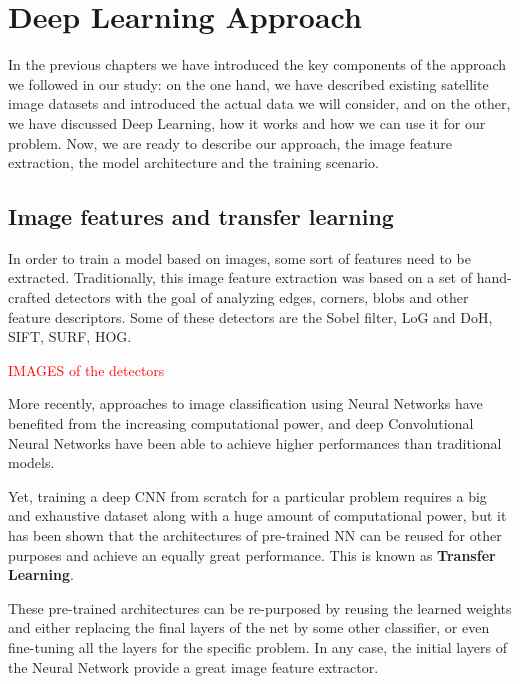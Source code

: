 
\chapter{Deep Learning Approach}

\label{Chapter4}


In the previous chapters we have introduced the key components of the approach we followed in our study: on the one hand, we have described existing satellite image datasets and introduced the actual data we will consider, and on the other, we have discussed Deep Learning, how it works and how we can use it for our problem. Now, we are ready to describe our approach, the image feature extraction, the model architecture and the training scenario.

\section{Image features and transfer learning}\label{transferLearning}

In order to train a model based on images, some sort of features need to be extracted. Traditionally, this image feature extraction was based on a set of hand-crafted detectors with the goal of analyzing edges, corners, blobs  and other feature descriptors. Some of these detectors are the Sobel filter, LoG and DoH, SIFT, SURF, HOG.

\textcolor{red}{IMAGES of the detectors}

More recently, approaches to image classification using Neural Networks have benefited from the increasing computational power, and deep Convolutional Neural Networks have been able to achieve higher performances than traditional models. 

Yet, training a deep CNN from scratch for a particular problem requires a big and exhaustive dataset along with a huge amount of computational power, but it has been shown that the architectures of pre-trained NN can be reused for other purposes and achieve an equally great performance. This is known as \textbf{Transfer Learning}.

These pre-trained architectures can be re-purposed by reusing the learned weights and either replacing the final layers of the net by some other classifier, or even fine-tuning all the layers for the specific problem. In any case, the initial layers of the Neural Network provide a great image feature extractor.

